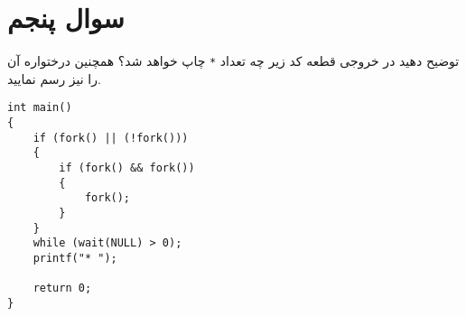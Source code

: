 \section{سوال پنجم}

توضیح دهید در خروجی قطعه کد زیر چه تعداد \texttt{*} چاپ خواهد شد؟ همچنین درختواره آن را نیز رسم نمایید.


\begin{latin}
\begin{lstlisting}[caption=Code of Q3, label=cpp_code_example]
int main() 
{
	if (fork() || (!fork())) 
	{
		if (fork() && fork()) 
		{
			fork();
		}
	}
	while (wait(NULL) > 0);
	printf("* ");
	
	return 0;
}
\end{lstlisting}
\end{latin}


